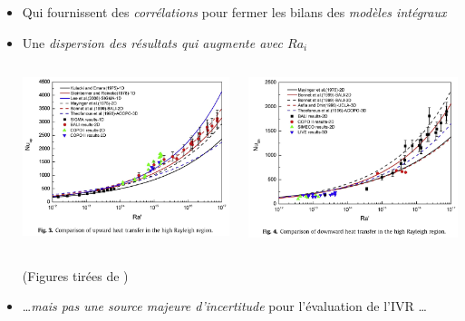 \begin{frame}[fragile]
\begin{itemize}
\item Qui fournissent des \emph{corrélations} pour fermer les bilans des \emph{modèles intégraux}
\item Une \emph{dispersion des résultats qui augmente avec $Ra_i$} \danger
\begin{columns}[T]
    \begin{column}{0.4\textwidth}
\centering \includegraphics[width=1.0\textwidth]{Figures/Fig3_Zhang2015.png}
    \end{column}
    \begin{column}{0.4\textwidth}
\centering \includegraphics[width=1.0\textwidth]{Figures/Fig4_Zhang2015.png}
    \end{column}
\end{columns}
{\tiny (Figures tirées de \cite{Zhang2015})}
 \item \dots \emph{mais pas une source majeure d'incertitude} pour l'évaluation de l'IVR \dots 
\end{itemize}
\end{frame}

